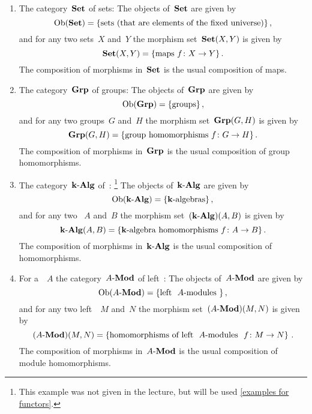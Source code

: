 \begin{example}
  \leavevmode
  \begin{enumerate}
    \item
      The category~$\mathbf{Set}$ of sets:
      The objects of~$\mathbf{Set}$ are given by
      \[
          \operatorname{Ob}(\mathbf{Set})
        = \{
            \text{sets (that are elements of the fixed universe)}
          \} \,,
      \]
      and for any two sets~$X$ and~$Y$ the morphism set~$\mathbf{Set}(X,Y)$ is given by
      \[
          \mathbf{Set}(X,Y)
        = \{
            \text{maps~$f \colon X \to Y$}
          \} \,.
      \]
      The composition of morphisms in~$\mathbf{Set}$ is the usual composition of maps.
    \item
      The category~$\mathbf{Grp}$ of groups:
      The objects of~$\mathbf{Grp}$ are given by
      \[
          \operatorname{Ob}(\mathbf{Grp})
        = \{
            \text{groups}
          \} \,,
      \]
      and for any two groups~$G$ and~$H$ the morphism set~$\mathbf{Grp}(G,H)$ is given by
      \[
          \mathbf{Grp}(G,H)
        = \{
            \text{group homomorphisms~$f \colon G \to H$}
          \} \,.
      \]
      The composition of morphisms in~$\mathbf{Grp}$ is the usual composition of group homomorphisms.
    \item
      The category~$\text{$\mathbf{k}$-$\mathbf{Alg}$}$ of~{\kalgs}:%
      \footnote{This example was not given in the lecture, but will be used \cref{examples for functors}.}
      The objects of~$\text{$\mathbf{k}$-$\mathbf{Alg}$}$ are given by
      \[
          \Ob(\kAlg)
        = \{
            \text{{\kalgs}}
          \} \,,
      \]
      and for any two {\kalgs}~$A$ and~$B$ the morphism set~$(\text{$\mathbf{k}$-$\mathbf{Alg}$})(A,B)$ is given by
      \[
          \kAlg(A,B)
        = \{
            \text{{\kalg} homomorphisms~$f \colon A \to B$}
          \} \,.
      \]
      The composition of morphisms in~$\text{$\mathbf{k}$-$\mathbf{Alg}$}$ is the usual composition of~{\kalg} homomorphisms.
    \item
      For a~{\kalg}~$A$ the category~$\text{$A$-$\mathbf{Mod}$}$ of left~{}:
      The objects of~$\text{$A$-$\mathbf{Mod}$}$ are given by
      \[
          \Ob(\Modl{A})
        = \{
            \text{left~{\modules{$A$}}}
          \} \,,
      \]
      and for any two left~{}~$M$ and~$N$ the morphism set~$(\text{$A$-$\mathbf{Mod}$})(M,N)$ is given by
      \[
          (\Modl{A})(M,N)
        = \left\{
            \text{homomorphisms of left~{\modules{$A$}}~$f \colon M \to N$}
          \right\} \,.
      \]
      The composition of morphisms in~$\text{$A$-$\mathbf{Mod}$}$ is the usual composition of module homomorphisms.
      

\end{enumerate}
\end{example}
